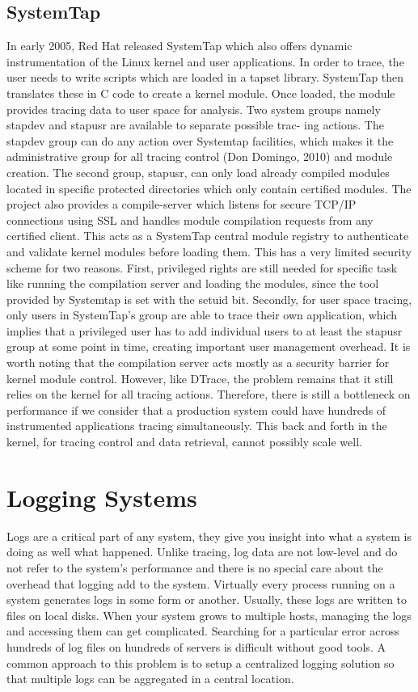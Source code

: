 \subsection{SystemTap}
In early 2005, Red Hat released SystemTap \cite{systemtap} which also
offers dynamic instrumentation of the Linux kernel and user applications. In
order to trace, the user needs to write scripts which are loaded in a tapset
library. SystemTap then translates these in C code to create a kernel module.
Once loaded, the module provides tracing data to user space for analysis.
Two system groups namely stapdev and stapusr are available to separate possible
trac- ing actions. The stapdev group can do any action over Systemtap
facilities, which makes it the administrative group for all tracing control (Don
Domingo, 2010) and module creation.
The second group, stapusr, can only load already compiled modules located in
specific protected directories which only contain certified modules.
The project also provides a compile-server which listens for secure TCP/IP
connections using SSL and handles module compilation requests from any certified
client. This acts as a SystemTap central module registry to authenticate and
validate kernel modules before loading them.
This has a very limited security scheme for two reasons. First, privileged
rights are still needed for specific task like running the compilation server
and loading the modules, since the tool provided by Systemtap is set with the
setuid bit. Secondly, for user space tracing, only users in SystemTap’s group
are able to trace their own application, which implies that a privileged user
has to add individual users to at least the stapusr group at some point in time,
creating important user management overhead.
It is worth noting that the compilation server acts mostly as a security barrier
for kernel module control. However, like DTrace, the problem remains that it
still relies on the kernel for all tracing actions. Therefore, there is still a
bottleneck on performance if we consider that a production system could have
hundreds of instrumented applications tracing simultaneously. This back and
forth in the kernel, for tracing control and data retrieval, cannot possibly
scale well.

\section{Logging Systems}\label{sec:logging-bkg}

Logs are a critical part of any system, they give you insight into what a system
is doing as well what happened. Unlike tracing, log data are not low-level and
do not refer to the system's performance and there is no special care about the
overhead that logging add to the system. Virtually every process running on a
system generates logs in some form or another. Usually, these logs are written
to files on local disks. When your system grows to multiple hosts, managing the
logs and accessing them can get complicated. Searching for a particular error
across hundreds of log files on hundreds of servers is difficult without good
tools. A common approach to this problem is to setup a centralized logging
solution so that multiple logs can be aggregated in a central location.

